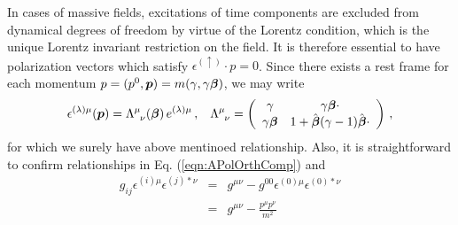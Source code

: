 In cases of massive fields,
excitations of time components are excluded from
dynamical degrees of freedom by virtue of
the Lorentz condition, which is the unique Lorentz invariant
restriction on the field. It is therefore essential to have
polarization vectors which satisfy
$\epsilon^{(\uparrow)} \cdot p = 0$.
Since there exists a rest frame for each momentum 
$p = (p^0, \mbox{\boldmath $p$}) = m (\gamma, \gamma \mbox{\boldmath $\beta$})$,
we may write
\begin{eqnarray}
\epsilon^{(\lambda)\mu} (\mbox{\boldmath $p$}) 
=
\Lambda^\mu_{\;\;\nu} (\mbox{\boldmath $\beta$})\, e^{(\lambda) \mu}
\,,
\hspace{3mm}
\Lambda^\mu_{\;\;\nu}
=
\left(
\begin{array}{cc}
\gamma & \gamma \mbox{\boldmath $\beta$} \cdot
\\
\gamma \mbox{\boldmath $\beta$} &
1 + \hat{\mbox{\boldmath $\beta$}}(\gamma - 1) \hat{\mbox{\boldmath $\beta$}} \cdot
\end{array}
\right)
\,,
\label{eqn:ApolVecMassive}
\end{eqnarray}
for which
we surely have above mentinoed relationship.
Also, it is straightforward to confirm relationships in Eq. (\ref{eqn:APolOrthComp})
and
\begin{eqnarray}
g_{ij} \epsilon^{(i)\mu} \epsilon^{(j)*\nu}
&=&
g^{\mu \nu} - g^{00} \epsilon^{(0)\mu} \epsilon^{(0)*\nu}
\nonumber\\
&=&
g^{\mu \nu} -
\frac{p^\mu p^\nu}{m^2}
\label{eqn:APolMassSpatialComp}
\end{eqnarray}
